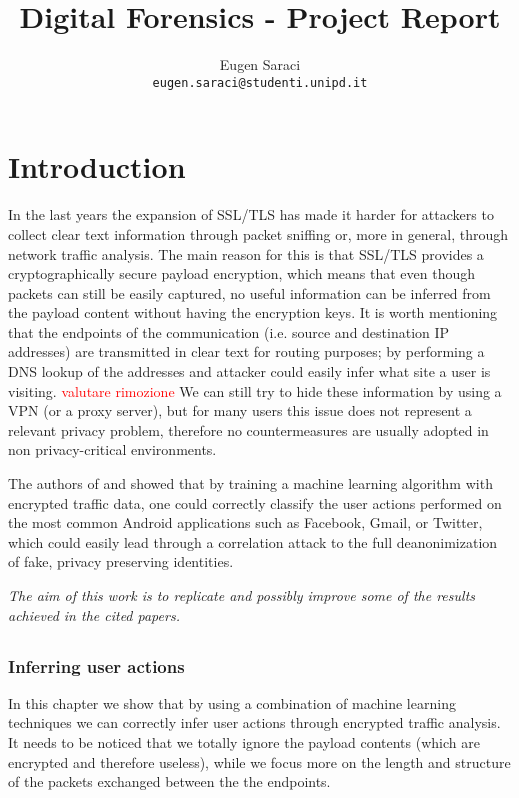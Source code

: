 \documentclass[a4paper,10pt]{report}
\title{Digital Forensics - Project Report}
\author{Eugen Saraci\\ \small{\texttt{eugen.saraci@studenti.unipd.it}}}
\newcommand\todo[1]{\textcolor{red}{#1}}
\begin{document}
\maketitle

\chapter{Introduction}
\label{ch:intro}
In the last years the expansion of SSL/TLS has made it harder for attackers to collect clear text information through packet sniffing or, more in general, through network traffic analysis. The main reason for this is that SSL/TLS provides a cryptographically secure payload encryption, which means that even though packets can still be easily captured, no useful information can be inferred from the payload content without having the encryption keys. It is worth mentioning that the endpoints of the communication (i.e. source and destination IP addresses) are transmitted in clear text for routing purposes; by performing a DNS lookup of the addresses and attacker could easily infer what site a user is visiting. \todo{valutare rimozione} We can still try to hide these information by using a VPN (or a proxy server), but for many users this issue does not represent a relevant privacy problem, therefore no countermeasures are usually adopted in non privacy-critical environments.

The authors of \cite{contiknocking} and \cite{contianalysis} showed that by training a machine learning algorithm with encrypted traffic data, one could correctly classify the user actions performed on the most common Android applications such as Facebook, Gmail, or Twitter, which could easily lead through a correlation attack to the full deanonimization of fake, privacy preserving identities.

\vspace{0.5cm}
\noindent \textit{The aim of this work is to replicate and possibly improve some of the results achieved  in the cited papers.}
\section{}


\subsection{Inferring user actions}
In this chapter we show that by using a combination of machine learning techniques we can correctly infer user actions through encrypted traffic analysis. It needs to be noticed that we totally ignore the payload contents (which are encrypted and therefore useless), while we focus more on the length and structure of the packets exchanged between the the endpoints.
\end{document}
